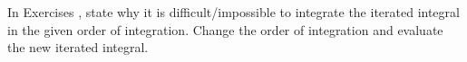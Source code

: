 {\noindent In Exercises}
{, state why it is difficult/impossible to integrate the iterated integral in the given order of integration. Change the order of integration and evaluate the new iterated integral.}
